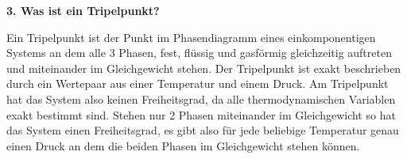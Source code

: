 \noindent\textbf{3. Was ist ein Tripelpunkt?}\\
\begin{addmargin}[25pt]{0pt}
Ein Tripelpunkt ist der Punkt im Phasendiagramm eines einkomponentigen Systems an dem alle 3 Phasen, fest, flüssig und gasförmig gleichzeitig auftreten und miteinander im Gleichgewicht stehen. Der Tripelpunkt ist exakt beschrieben durch ein Wertepaar aus einer Temperatur und einem Druck. Am Tripelpunkt hat das System also keinen Freiheitsgrad, da alle thermodynamischen Variablen exakt bestimmt sind. Stehen nur 2 Phasen miteinander im Gleichgewicht so hat das System einen Freiheitsgrad, es gibt also für jede beliebige Temperatur genau einen Druck an dem die beiden Phasen im Gleichgewicht stehen können.\\
\end{addmargin}


